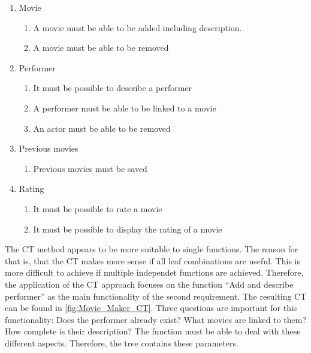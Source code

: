 \begin{enumerate}
\item Movie	
	\begin{enumerate}
		\item A movie must be able to be added including description.
		\item A movie must be able to be removed
	\end{enumerate}
\item  Performer
	\begin{enumerate}
		\item It must be possible to describe a performer
		\item A performer must be able to be linked to a movie
		\item An actor must be able to be removed
	\end{enumerate}
\item Previous movies
	\begin{enumerate}
		\item Previous movies must be saved
	\end{enumerate}
\item Rating
	\begin{enumerate}
		\item It must be possible to rate a movie
		\item It must be possible to display the rating of a movie
	\end{enumerate}
\end{enumerate}

The CT method appears to be more suitable to single functions. The reason for that is, that the CT makes more sense if all leaf combinations are useful. This is more difficult to achieve if multiple independet functions are achieved. Therefore, the application of the CT approach focuses on the function \enquote{Add and describe performer} as the main functionality of the second requirement. The resulting CT can be found in \autoref{fig:Movie_Maker_CT}. Three questions are important for this functionality: Does the performer already exist? What movies are linked to them? How complete is their description? The function must be able to deal with these different aspects. Therefore, the tree contains these parameters.

